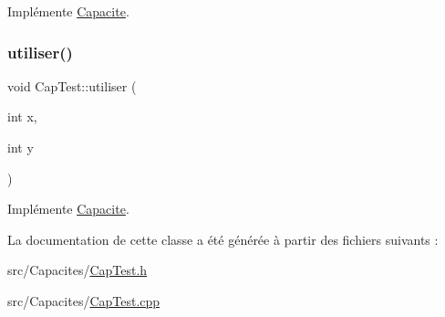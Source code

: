 Implémente \hyperlink{class_capacite_a7d4e86c20cd198960f25c0eb443148fe}{Capacite}.

\mbox{\label{class_cap_test_af85984f6d9330e5527feff1a62ee4242}} 
\subsubsection{\texorpdfstring{utiliser()}{utiliser()}}
{\footnotesize\ttfamily void Cap\+Test\+::utiliser (\begin{DoxyParamCaption}\item[{int}]{x,  }\item[{int}]{y }\end{DoxyParamCaption})\hspace{0.3cm}{\ttfamily [virtual]}}



Implémente \hyperlink{class_capacite_a4d4f643987fcc2168567bf28a36ea418}{Capacite}.



La documentation de cette classe a été générée à partir des fichiers suivants \+:\begin{DoxyCompactItemize}
\item 
src/\+Capacites/\hyperlink{_cap_test_8h}{Cap\+Test.\+h}\item 
src/\+Capacites/\hyperlink{_cap_test_8cpp}{Cap\+Test.\+cpp}\end{DoxyCompactItemize}
